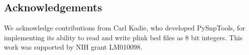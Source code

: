 \documentclass[11pt]{article}
\begin{document}
\begin{singlespace}
\section*{Acknowledgements}

We acknowledge contributions from Carl Kadie, who developed PySnpTools, for implementing its ability to read and write plink bed files as 8 bit integers. This work was supported by NIH grant LM010098. 

\end{singlespace}



\end{document}

